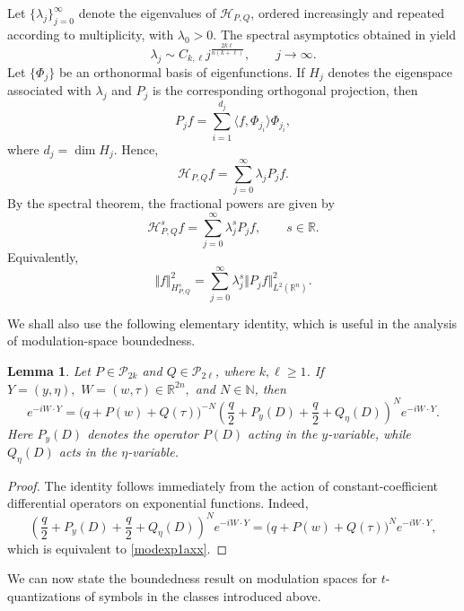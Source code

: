 \documentclass[12pt, reqno]{amsart}
\newtheorem{lemma}[theorem]{Lemma}
\theoremstyle{definition}
\theoremstyle{remark}
\numberwithin{equation}{section}
\begin{document}
Let $\{\lambda_j\}_{j=0}^\infty$ denote the eigenvalues of $\mathcal H_{P,Q}$, ordered increasingly and repeated according to multiplicity, with $\lambda_0>0$. The spectral asymptotics obtained in \cite{anh:cdr2} yield
\begin{equation}
\label{specA}
    \lambda_j
    \sim
    C_{k,\ell}
    j^{\frac{2k\ell}{n(k+\ell)}},
    \qquad j\to\infty .
\end{equation}
Let $\{\Phi_j\}$ be an orthonormal basis of eigenfunctions. If $H_j$ denotes the eigenspace associated with $\lambda_j$ and $P_j$ is the corresponding orthogonal projection, then
\[
    P_jf
    =
    \sum_{i=1}^{d_j}
    \langle f,\Phi_{j_i}\rangle \Phi_{j_i},
\]
where $d_j=\dim H_j$. Hence,
\[
    \mathcal H_{P,Q}f
    =
    \sum_{j=0}^\infty
    \lambda_j P_jf .
\]
By the spectral theorem, the fractional powers are given by
\[
    \mathcal H_{P,Q}^s f
    =
    \sum_{j=0}^\infty
    \lambda_j^s P_jf,
    \qquad s\in\mathbb R.
\]
Equivalently,
\[
    \Vert f\Vert_{H_{P,Q}^s}^2
    =
    \sum_{j=0}^\infty
    \lambda_j^s
    \Vert P_jf\Vert_{L^2(\mathbb R^n)}^2 .
\]

We shall also use the following elementary identity, which is useful in the analysis of modulation-space boundedness.

\begin{lemma}
\label{lempq3s}
Let $P\in\mathcal P_{2k}$ and $Q\in\mathcal P_{2\ell}$, where $k,\ell\geq1$. If $Y=(y,\eta),\,\, W=(w,\tau)\in\mathbb R^{2n},$
and $N\in\mathbb N$, then
\begin{equation}
\label{modexp1axx}
    e^{-iW\cdot Y}
    =
    \big(q+P(w)+Q(\tau)\big)^{-N}
    \left(
    \frac q2+P_y(D)+\frac q2+Q_\eta(D)
    \right)^N
    e^{-iW\cdot Y}.
\end{equation}
Here $P_y(D)$ denotes the operator $P(D)$ acting in the $y$-variable, while $Q_\eta(D)$ acts in the $\eta$-variable.
\end{lemma}

\begin{proof}
The identity follows immediately from the action of constant-coefficient differential operators on exponential functions. Indeed,
\[
    \left(
    \frac q2+P_y(D)+\frac q2+Q_\eta(D)
    \right)^N
    e^{-iW\cdot Y}
    =
    \big(q+P(w)+Q(\tau)\big)^N
    e^{-iW\cdot Y},
\]
which is equivalent to \eqref{modexp1axx}.
\end{proof}


We can now state the boundedness result on modulation spaces for $t$-quantizations of symbols in the classes introduced above.
\end{document}
